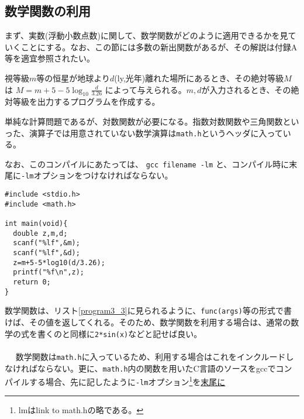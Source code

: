 \subsection{数学関数の利用}
まず、実数(浮動小数点数)に関して、数学関数がどのように適用できるかを見ていくことにする。なお、この節には多数の新出関数があるが、その解説は付録A等を適宜参照されたい。
\begin{boxnote}
視等級$m$等の恒星が地球より$d$(ly,光年)離れた場所にあるとき、その絶対等級$M$は
$M=m+5-5\log _{10}\frac{d}{3.26} $
によって与えられる。$m,d$が入力されるとき、その絶対等級を出力するプログラムを作成する。
\begin{multicols}{2}
単純な計算問題であるが、対数関数が必要になる。指数対数関数や三角関数といった、演算子では用意されていない数学演算は\verb|math.h|というヘッダに入っている。

なお、このコンパイルにあたっては、
\verb|gcc filename -lm|
と、コンパイル時に末尾に\verb|-lm|オプションをつけなければならない。
\begin{lstlisting}[caption=絶対等級の計算,label=program3_3]
#include <stdio.h>
#include <math.h>

int main(void){
  double z,m,d;
  scanf("%lf",&m);
  scanf("%lf",&d);
  z=m+5-5*log10(d/3.26);
  printf("%f\n",z);
  return 0;
}
\end{lstlisting}
\end{multicols}
\end{boxnote}
数学関数は、リスト\ref{program3_3}に見られるように、\verb|func(args)|等の形式で書けば、その値を返してくれる。そのため、数学関数を利用する場合は、通常の数学の式を書くのと同様に\verb|2*sin(x)|などと記せば良い。
\\ \\　
数学関数は\verb|math.h|に入っているため、利用する場合はこれをインクルードしなければならない。更に、\verb|math.h|内の関数を用いたC言語のソースをgccでコンパイルする場合、先に記したように\verb|-lm|オプション\footnote{lmはlink to math.hの略である。}を\underline{末尾に}
